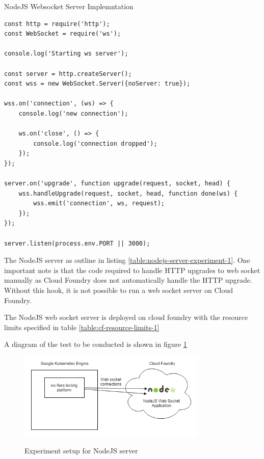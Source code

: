 \begin{listing}[H]
    \caption{NodeJS Websocket Server Implemntation}
    \label{table:nodejs-server-experiment-1}
    \begin{verbatim}
const http = require('http');
const WebSocket = require('ws');

console.log('Starting ws server');

const server = http.createServer();
const wss = new WebSocket.Server({noServer: true});

wss.on('connection', (ws) => {
    console.log('new connection');

    ws.on('close', () => {
        console.log('connection dropped');
    });
});

server.on('upgrade', function upgrade(request, socket, head) {
    wss.handleUpgrade(request, socket, head, function done(ws) {
        wss.emit('connection', ws, request);
    });
});

server.listen(process.env.PORT || 3000);
\end{verbatim}
\end{listing}

The NodeJS server as outline in listing \ref{table:nodejs-server-experiment-1}. One important note is that the code required to handle HTTP upgrades to web socket manually as Cloud Foundry does not automatically handle the HTTP upgrade. Without this hook, it is not possible to run a web socket server on Cloud Foundry. 

The NodeJS web socket server is deployed on cloud foundry with the resource limits specified in table \ref{table:cf-resource-limits-1}

\begin{table}[H]
\caption{Cloud Foundry Resource Limits}
\label{table:cf-resource-limits-1}
\end{table}

A diagram of the test to be conducted is shown in figure \ref{fig:experiment-1-vis-nodejs}

\begin{figure}[H]
  \centering
  \caption{Experiment setup for NodeJS server}
    \includegraphics[width=0.8\textwidth]{figures/experiments/experiment-vis-nodejs.png}
    \label{fig:experiment-1-vis-nodejs}
\end{figure}

